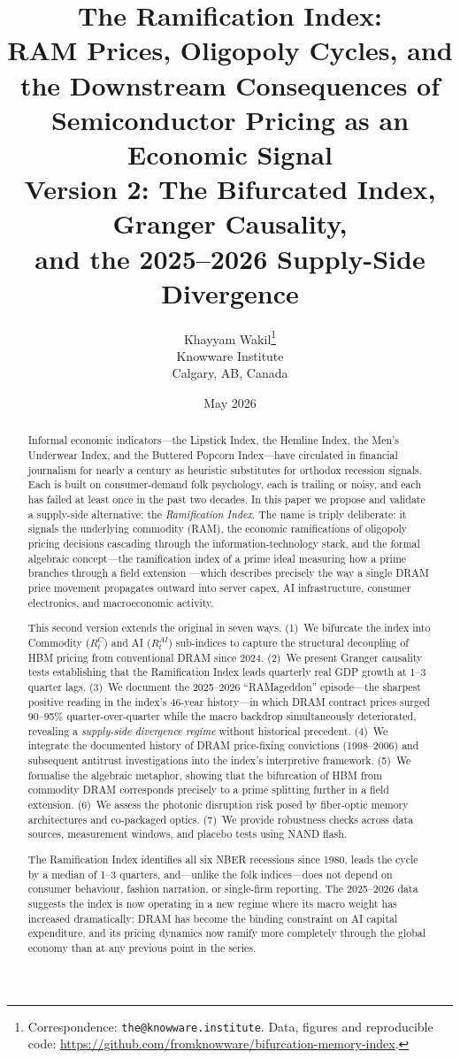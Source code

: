 \documentclass[12pt]{article}
\title{\textbf{The Ramification Index:} \\ 
\Large RAM Prices, Oligopoly Cycles, and the Downstream Consequences of Semiconductor Pricing as an Economic Signal \\[6pt]
\large Version 2: The Bifurcated Index, Granger Causality, \\ and the 2025--2026 Supply-Side Divergence}
\author{Khayyam Wakil\thanks{Correspondence: \texttt{the@knowware.institute}. Data, figures and reproducible code: \url{https://github.com/fromknowware/bifurcation-memory-index}.} \\
\small Knowware Institute \\
\small Calgary, AB, Canada}
\date{May 2026}
\theoremstyle{definition}
\begin{document}
\maketitle

\begin{abstract}
Informal economic indicators---the Lipstick Index, the Hemline Index, the Men's Underwear Index, and the Buttered Popcorn Index---have circulated in financial journalism for nearly a century as heuristic substitutes for orthodox recession signals. Each is built on consumer-demand folk psychology, each is trailing or noisy, and each has failed at least once in the past two decades. In this paper we propose and validate a supply-side alternative: the \emph{Ramification Index}. The name is triply deliberate: it signals the underlying commodity (RAM), the economic ramifications of oligopoly pricing decisions cascading through the information-technology stack, and the formal algebraic concept---the ramification index of a prime ideal measuring how a prime branches through a field extension \cite{Neukirch1999}---which describes precisely the way a single DRAM price movement propagates outward into server capex, AI infrastructure, consumer electronics, and macroeconomic activity.

This second version extends the original in seven ways. (1)~We bifurcate the index into Commodity ($R_t^C$) and AI ($R_t^{AI}$) sub-indices to capture the structural decoupling of HBM pricing from conventional DRAM since 2024. (2)~We present Granger causality tests establishing that the Ramification Index leads quarterly real GDP growth at 1--3 quarter lags. (3)~We document the 2025--2026 ``RAMageddon'' episode---the sharpest positive reading in the index's 46-year history---in which DRAM contract prices surged 90--95\% quarter-over-quarter while the macro backdrop simultaneously deteriorated, revealing a \emph{supply-side divergence regime} without historical precedent. (4)~We integrate the documented history of DRAM price-fixing convictions (1998--2006) and subsequent antitrust investigations into the index's interpretive framework. (5)~We formalise the algebraic metaphor, showing that the bifurcation of HBM from commodity DRAM corresponds precisely to a prime splitting further in a field extension. (6)~We assess the photonic disruption risk posed by fiber-optic memory architectures and co-packaged optics. (7)~We provide robustness checks across data sources, measurement windows, and placebo tests using NAND flash.

The Ramification Index identifies all six NBER recessions since 1980, leads the cycle by a median of 1--3 quarters, and---unlike the folk indices---does not depend on consumer behaviour, fashion narration, or single-firm reporting. The 2025--2026 data suggests the index is now operating in a new regime where its macro weight has increased dramatically: DRAM has become the binding constraint on AI capital expenditure, and its pricing dynamics now ramify more completely through the global economy than at any previous point in the series.
\end{abstract}
\end{document}
